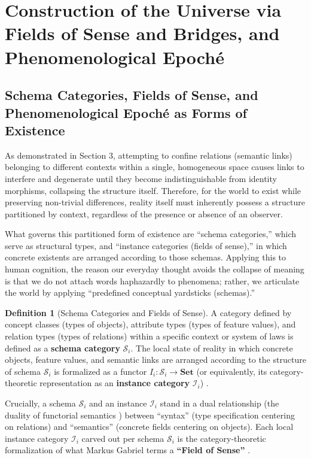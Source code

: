 \documentclass[11pt,a4paper]{article}
\theoremstyle{definition}
\newtheorem{definition}{Definition}[section]
\theoremstyle{plain}
\begin{document}
\section{Construction of the Universe via Fields of Sense and Bridges, and Phenomenological Epoch\'e}

\subsection{Schema Categories, Fields of Sense, and Phenomenological Epoch\'e as Forms of Existence}

As demonstrated in Section 3, attempting to confine relations (semantic links) belonging to different contexts within a single, homogeneous space causes links to interfere and degenerate until they become indistinguishable from identity morphisms, collapsing the structure itself. Therefore, for the world to exist while preserving non-trivial differences, reality itself must inherently possess a structure partitioned by context, regardless of the presence or absence of an observer.

What governs this partitioned form of existence are ``schema categories,'' which serve as structural types, and ``instance categories (fields of sense),'' in which concrete existents are arranged according to those schemas. Applying this to human cognition, the reason our everyday thought avoids the collapse of meaning is that we do not attach words haphazardly to phenomena; rather, we articulate the world by applying ``predefined conceptual yardsticks (schemas).''

\begin{definition}[Schema Categories and Fields of Sense]
A category defined by concept classes (types of objects), attribute types (types of feature values), and relation types (types of relations) within a specific context or system of laws is defined as a \textbf{schema category} $\mathcal{S}_{i}$. The local state of reality in which concrete objects, feature values, and semantic links are arranged according to the structure of schema $\mathcal{S}_{i}$ is formalized as a functor $I_i: \mathcal{S}_i \to \mathbf{Set}$ (or equivalently, its category-theoretic representation as an \textbf{instance category} $\mathcal{I}_{i}$) \cite{lawvere1963,spivak2012}.
\end{definition}

Crucially, a schema $\mathcal{S}_{i}$ and an instance $\mathcal{I}_{i}$ stand in a dual relationship (the duality of functorial semantics \cite{lawvere1963}) between ``syntax'' (type specification centering on relations) and ``semantics'' (concrete fields centering on objects). Each local instance category $\mathcal{I}_{i}$ carved out per schema $\mathcal{S}_{i}$ is the category-theoretic formalization of what Markus Gabriel terms a \textbf{``Field of Sense''} \cite{gabriel2015}.
\end{document}
